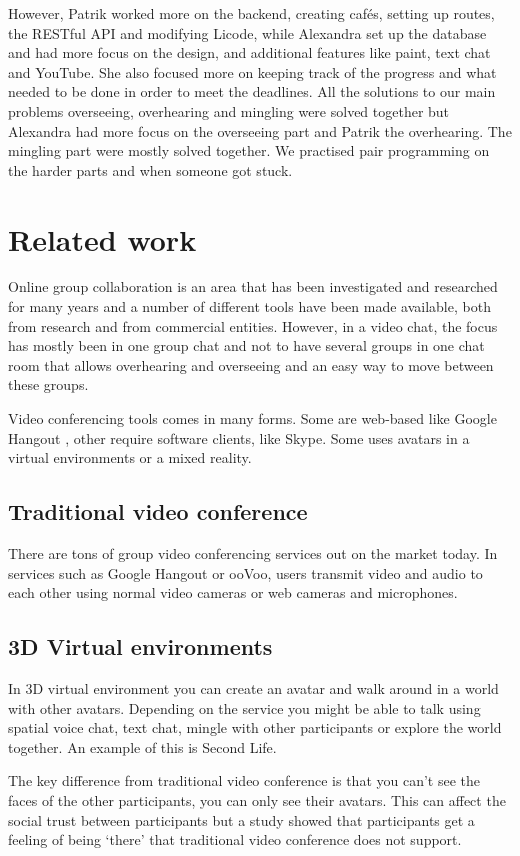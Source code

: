 \documentclass[12pt, titlepage]{article}
\begin{document}
However, Patrik worked more on the backend, creating cafés, setting up routes, the RESTful API and modifying Licode, while Alexandra set up the database and had more focus on the design, and additional features like paint, text chat and YouTube. She also focused more on keeping track of the progress and what needed to be done in order to meet the deadlines. All the solutions to our main problems overseeing, overhearing and mingling were solved together but Alexandra had more focus on the overseeing part and Patrik the overhearing. The mingling part were mostly solved together. We practised pair programming on the harder parts and when someone got stuck.
\section{Related work}
Online group collaboration is an area that has been investigated and researched for many years and a number of different tools have been made available, both from research and from commercial entities. However, in a video chat, the focus has mostly been in one group chat and not to have several groups in one chat room that allows overhearing and overseeing and an easy way to move between these groups.

Video conferencing tools comes in many forms. Some are web-based like Google Hangout \cite{2}, other require software clients, like Skype\cite{3}. Some uses avatars in a virtual environments or a mixed reality.
\subsection{Traditional video conference}
There are tons of group video conferencing services out on the market today. In services such as Google Hangout\cite{2} or ooVoo\cite{4}, users transmit video and audio to each other using normal video cameras or web cameras and microphones.
\subsection{3D Virtual environments}
In 3D virtual environment you can create an avatar and walk around in a world with other avatars. Depending on the service you might be able to talk using spatial voice chat, text chat, mingle with other participants or explore the world together. An example of this is Second Life\cite{5}.

The key difference from traditional video conference is that you can’t see the faces of the other participants, you can only see their avatars. This can affect the social trust between participants but a study showed that participants get a feeling of being ‘there’ that traditional video conference does not support\cite{6}.
\end{document}
